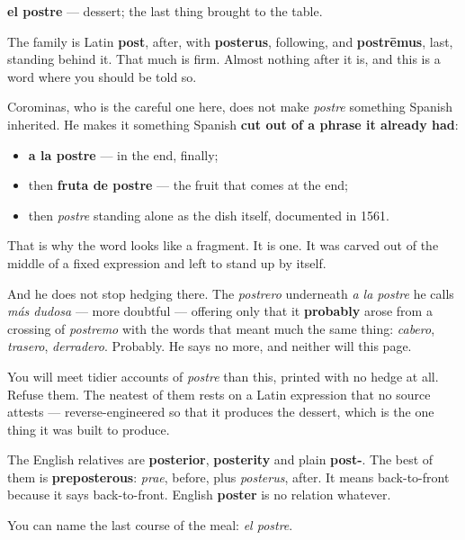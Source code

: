 \begin{cousinweb}
\textbf{el postre} — dessert; the last thing brought to the table.

The family is Latin \textbf{post}, after, with \textbf{posterus}, following, and \textbf{postrēmus}, last, standing behind it. That much is firm. Almost nothing after it is, and this is a word where you should be told so.

Corominas, who is the careful one here, does not make \emph{postre} something Spanish inherited. He makes it something Spanish \textbf{cut out of a phrase it already had}:

\begin{itemize}
\raggedright
  \item \textbf{a la postre} — in the end, finally;
  \item then \textbf{fruta de postre} — the fruit that comes at the end;
  \item then \emph{postre} standing alone as the dish itself, documented in 1561.
\end{itemize}

That is why the word looks like a fragment. It is one. It was carved out of the middle of a fixed expression and left to stand up by itself.

And he does not stop hedging there. The \emph{postrero} underneath \emph{a la postre} he calls \emph{más dudosa} — more doubtful — offering only that it \textbf{probably} arose from a crossing of \emph{postremo} with the words that meant much the same thing: \emph{cabero}, \emph{trasero}, \emph{derradero}. Probably. He says no more, and neither will this page.

You will meet tidier accounts of \emph{postre} than this, printed with no hedge at all. Refuse them. The neatest of them rests on a Latin expression that no source attests — reverse-engineered so that it produces the dessert, which is the one thing it was built to produce.

The English relatives are \textbf{posterior}, \textbf{posterity} and plain \textbf{post-}. The best of them is \textbf{preposterous}: \emph{prae}, before, plus \emph{posterus}, after. It means back-to-front because it says back-to-front. English \textbf{poster} is no relation whatever.
\end{cousinweb}

\begin{grammarlens}[title={What you've built}]
You can name the last course of the meal: \emph{el postre}.
\end{grammarlens}


